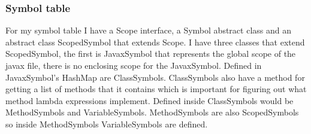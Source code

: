 \documentclass[twocolumn,notitlepage]{report}
\begin{document}
\subsubsection*{Symbol table}
For my symbol table I have a Scope interface, a Symbol abstract class and an
abstract class ScopedSymbol that extends Scope. I have three classes that extend ScopedSymbol, the first
is JavaxSymbol that represents the global scope of the javax file, there is no enclosing scope for the JavaxSymbol. Defined in JavaxSymbol's HashMap are ClassSymbols. ClassSymbols also have a method for getting a list of methods that it contains which is important for figuring out what method lambda expressions implement. Defined inside ClassSymbols would be MethodSymbols and VariableSymbols. MethodSymbols are also
ScopedSymbols so inside MethodSymbols VariableSymbols are defined.
\end{document}

